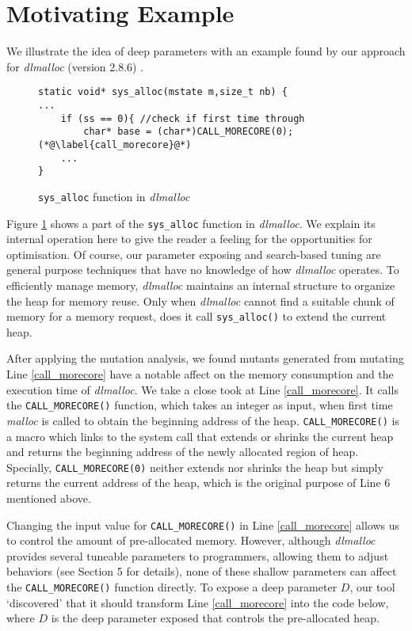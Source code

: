 
\section{Motivating Example}

We illustrate the idea of deep parameters with an example found by our approach for \emph{dlmalloc} (version 2.8.6) \cite{lea1996memory}.

\begin{figure}[ht]
\begin{lstlisting}
static void* sys_alloc(mstate m,size_t nb) {
...
	if (ss == 0){ //check if first time through
		char* base = (char*)CALL_MORECORE(0); (*@\label{call_morecore}@*)
	...
}
\end{lstlisting}
\vspace{-1.5em}
\caption{{\tt sys\_alloc} function in \emph{dlmalloc}}
\label{exp}
\end{figure}

Figure \ref{exp} shows a part of the {\tt sys\_alloc} function in \emph{dlmalloc}. We explain its internal operation here to give the reader a feeling for the opportunities for optimisation. Of course, our parameter exposing and search-based tuning are general purpose techniques that have no knowledge of how \emph{dlmalloc} operates. To efficiently manage memory, \emph{dlmalloc} maintains an internal structure to organize the heap for memory reuse. Only when \emph{dlmalloc} cannot find a suitable chunk of memory for a memory request, does it call {\tt sys\_alloc()} to extend the current heap.

After applying the mutation analysis, we found mutants generated from mutating Line \ref{call_morecore} have a notable affect on the memory consumption and the execution time of \emph{dlmalloc}. We take a close took at Line \ref{call_morecore}. It calls the {\tt CALL\_MORECORE()} function, which takes an integer as input, when first time \emph{malloc} is called to obtain the beginning address of the heap. {\tt CALL\_MORECORE()} is a macro which links to the system call that extends or shrinks the current heap and returns the beginning address of the newly allocated region of heap. Specially, {\tt CALL\_MORECORE(0)} neither extends nor shrinks the heap but simply returns the current address of the heap, which is the original purpose of Line 6 mentioned above.

Changing the input value for {\tt CALL\_MORECORE()} in Line \ref{call_morecore} allows us to control the amount of pre-allocated memory. However, although \emph{dlmalloc} provides several tuneable parameters to programmers, allowing them to adjust behaviors (see Section 5 for details), none of these shallow parameters can affect the {\tt CALL\_MORECORE()} function directly. To expose a deep parameter $D$, our tool `discovered' that it should transform Line \ref{call_morecore} into the code below, where $D$ is the deep parameter exposed that controls the pre-allocated heap.

